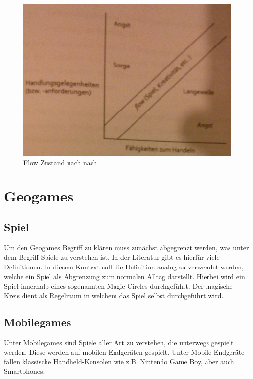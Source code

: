 \begin{figure}[H]
\begin{center}
\includegraphics[width=120mm]{images/ch03_img02_flow.jpg}
\caption{Flow Zustand nach  nach \cite{Csikszentmihalyi.1991}}
\label{img:ch03_img02_flow}
\end{center}
\end{figure}

\section{Geogames}
\label{subsec:S3_Geogames}

\subsection*{Spiel}

Um den Geogames Begriff zu klären muss zunächst abgegrenzt werden, was unter dem Begriff Spiele zu verstehen ist. In der Literatur gibt es hierfür viele Definitionen.
In diesem Kontext soll die Definition analog zu \cite{Salen.2010} verwendet werden, welche ein Spiel als Abgrenzung zum normalen Alltag darstellt. Hierbei wird ein Spiel innerhalb eines sogenannten Magic Circles durchgeführt.
Der magische Kreis dient als Regelraum in welchem das Spiel selbst durchgeführt wird.


\subsection*{Mobilegames}

Unter Mobilegames sind Spiele aller Art zu verstehen, die unterwegs gespielt werden. Diese werden auf mobilen Endgeräten gespielt. \cite{Bell.2006} Unter Mobile Endgeräte fallen klassische Handheld-Konsolen wie z.B. Nintendo Game Boy, aber auch Smartphones.

